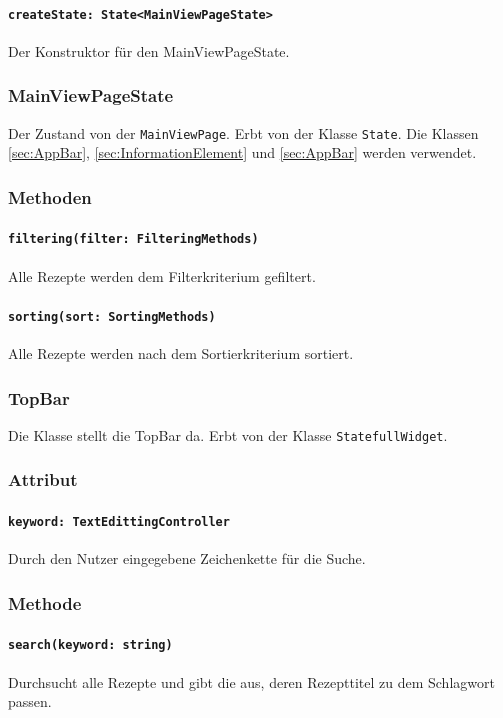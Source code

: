 \documentclass{entwurfsheft}
\begin{document}
            \paragraph*{\texttt{createState: State<MainViewPageState>}} Der Konstruktor für den MainViewPageState.

    \subsubsection{MainViewPageState}
        Der Zustand von der \texttt{MainViewPage}. Erbt von der Klasse \texttt{State}. Die Klassen \ref{sec:AppBar}, \ref{sec:InformationElement} und \ref{sec:AppBar} werden verwendet.
        \subsubsection*{Methoden}
            \paragraph*{\texttt{filtering(filter: FilteringMethods)}} Alle Rezepte werden dem Filterkriterium gefiltert.
            \paragraph*{\texttt{sorting(sort: SortingMethods)}} Alle Rezepte werden nach dem Sortierkriterium sortiert.

    \subsubsection{TopBar}
        Die Klasse stellt die TopBar da. Erbt von der Klasse \texttt{StatefullWidget}.
        \subsubsection*{Attribut}
            \paragraph*{\texttt{keyword: TextEdittingController}} Durch den Nutzer eingegebene Zeichenkette für die Suche.

        \subsubsection*{Methode}
            \paragraph*{\texttt{search(keyword: string)}} Durchsucht alle Rezepte und gibt die aus, deren Rezepttitel zu dem Schlagwort passen.
\end{document}
